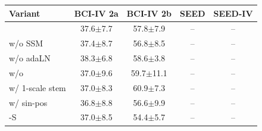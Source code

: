 \begin{tabular}{lcccc}
\toprule
Variant & BCI-IV 2a & BCI-IV 2b & SEED & SEED-IV \\
\midrule
\method{} & 37.6$\pm$7.7 & 57.8$\pm$7.9 & -- & -- \\
\method{} w/o SSM & 37.4$\pm$8.7 & 56.8$\pm$8.5 & -- & -- \\
\method{} w/o adaLN & 38.3$\pm$6.8 & 58.6$\pm$3.8 & -- & -- \\
\method{} w/o \scn{} & 37.0$\pm$9.6 & 59.7$\pm$11.1 & -- & -- \\
\method{} w/ 1-scale stem & 37.0$\pm$8.3 & 60.9$\pm$7.3 & -- & -- \\
\method{} w/ sin-pos & 36.8$\pm$8.8 & 56.6$\pm$9.9 & -- & -- \\
\method{}-S & 37.0$\pm$8.5 & 54.4$\pm$5.7 & -- & -- \\
\bottomrule
\end{tabular}
